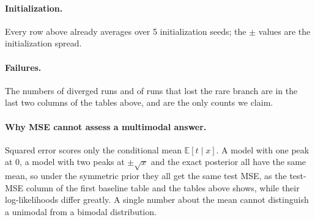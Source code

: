 \documentclass[11pt]{article}
\begin{document}
\paragraph{Initialization.} Every row above already averages over 5 initialization seeds; the $\pm$ values are the initialization spread.

\paragraph{Failures.} The numbers of diverged runs and of runs that lost the rare branch are in the last two columns of the tables above, and are the only counts we claim.

\paragraph{Why MSE cannot assess a multimodal answer.} Squared error scores only the conditional mean $\mathbb E[t\mid x]$. A model with one peak at $0$, a model with two peaks at $\pm\sqrt x$ and the exact posterior all have the same mean, so under the symmetric prior they all get the same test MSE, as the test-MSE column of the first baseline table and the tables above shows, while their log-likelihoods differ greatly. A single number about the mean cannot distinguish a unimodal from a bimodal distribution.

\clearpage

\end{document}

